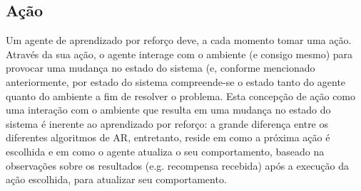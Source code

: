 \documentclass[cic,tc]{iiufrgs}
\newcommand\bruno[1]{\textcolor{magenta}{#1}}
\begin{document}
    \subsection{Ação}
    Um agente de aprendizado por reforço deve, a cada momento tomar uma ação. Através da sua ação, o agente interage com o ambiente (e consigo mesmo)
    para provocar uma mudança no estado do sistema (e, conforme mencionado anteriormente, por estado do sistema compreende-se o estado tanto do agente quanto do ambiente
     a fim de resolver
    o problema. Esta concepção de ação como uma interação com o ambiente que resulta em uma mudança no estado do sistema é inerente ao aprendizado por reforço:
    a grande diferença entre os diferentes algoritmos de AR, entretanto, reside em como a próxima ação é escolhida e em como o agente atualiza o seu comportamento,
     baseado na observações sobre os resultados (e.g. recompensa recebida) após a execução da ação escolhida, para atualizar seu comportamento.
    
\end{document}
